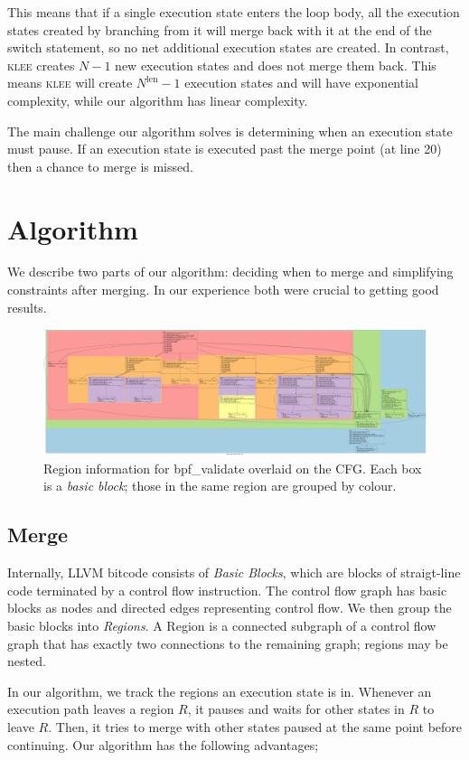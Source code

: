 \documentclass[12pt,a4paper]{article}
\newcommand{\klee}{\textsc{klee }}
\begin{document}
This means that if a single execution state enters the loop body, all the execution states created by branching from it will merge back with it at the end of the switch statement, so no net additional execution states are created. In contrast, \klee creates $N-1$ new execution states and does not merge them back. This means \klee will create $N^\text{len} - 1$ execution states and will have exponential complexity, while our algorithm has linear complexity.

The main challenge our algorithm solves is determining when an execution state must pause. If an execution state is executed past the merge point (at line 20) then a chance to merge is missed.

\section{Algorithm}\label{algorithm}
We describe two parts of our algorithm: deciding when to merge and simplifying constraints after merging. In our experience both were crucial to getting good results.
\begin{figure}
  \centering
    \includegraphics[width=\textwidth]{reg.png}
  \caption{Region information for bpf\_validate overlaid on the CFG. Each box is a \emph{basic block}; those in the same region are grouped by colour.}
\end{figure}

\subsection{Merge}
Internally, LLVM bitcode consists of \emph{Basic Blocks}, which are blocks of straigt-line code terminated by a control flow instruction. The control flow graph has basic blocks as nodes and directed edges representing control flow. We then group the basic blocks into \emph{Regions}. A Region \cite{regions} is a connected subgraph of a control flow graph that has exactly two connections to the remaining graph; regions may be nested. 

In our algorithm, we track the regions an execution state is in. Whenever an execution path leaves a region $R$, it pauses and waits for other states in $R$ to leave $R$. Then, it tries to merge with other states paused at the same point before continuing. Our algorithm has the following advantages;
\end{document}
